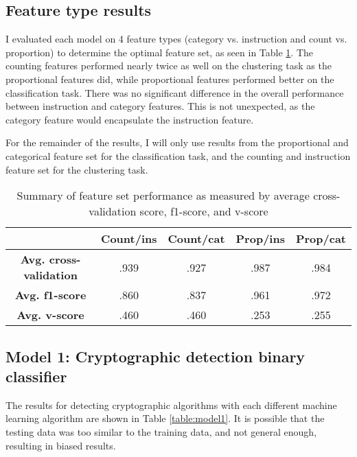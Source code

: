 \subsection{Feature type results}
I evaluated each model on 4 feature types (category vs. instruction and count vs. proportion) to determine the optimal feature set, as seen in Table \ref{table:feature}.  The counting features performed nearly twice as well on the clustering task as the proportional features did, while proportional features performed better on the classification task.  There was no significant difference in the overall performance between instruction and category features.  This is not unexpected, as the category feature would encapsulate the instruction feature.

For the remainder of the results, I will only use results from the proportional and categorical feature set for the classification task, and the counting and instruction feature set for the clustering task.

\begin{center}
\begin{table}
\begin{tabular}{c|cccc}
& \textbf{Count/ins} & \textbf{Count/cat} & \textbf{Prop/ins} & \textbf{Prop/cat}\\
\hline
\textbf{Avg. cross-validation} & .939 & .927 & .987 & .984\\
\textbf{Avg. f1-score} & .860 & .837 & .961 & .972\\
\textbf{Avg. v-score} & .460 & .460 & .253 & .255\\

\end{tabular}
\caption{Summary of feature set performance as measured by average cross-validation score, f1-score, and v-score}
\label{table:feature}
\end{table}
\end{center}

\subsection{Model 1: Cryptographic detection binary classifier}
The results for detecting cryptographic algorithms with each different machine learning algorithm are shown in Table \ref{table:model1}.  It is possible that the testing data was too similar to the training data, and not general enough, resulting in biased results.

